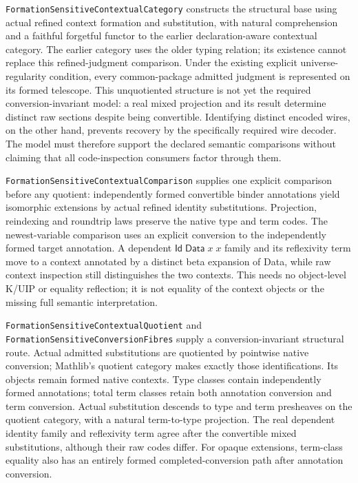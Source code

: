 \documentclass[11pt]{article}
\theoremstyle{definition}
\theoremstyle{remark}
\begin{document}
\nolinkurl{FormationSensitiveContextualCategory} constructs the structural
base using actual refined context formation and substitution, with natural
comprehension and a faithful forgetful functor to the earlier
declaration-aware contextual category. The earlier category uses the older
typing relation; its existence cannot replace this refined-judgment
comparison. Under the existing explicit universe-regularity condition, every
common-package admitted judgment is represented on its formed telescope.
This unquotiented structure is not yet the required conversion-invariant
model: a real mixed projection and its result determine distinct raw
sections despite being convertible. Identifying distinct encoded wires,
on the other hand, prevents recovery by the specifically required wire
decoder. The model must therefore support the declared semantic comparisons
without claiming that all code-inspection consumers factor through them.

\nolinkurl{FormationSensitiveContextualComparison} supplies one explicit
comparison before any quotient: independently formed convertible binder
annotations yield isomorphic extensions by actual refined identity
substitutions. Projection, reindexing and roundtrip laws preserve the native
type and term codes. The newest-variable comparison uses an explicit
conversion to the independently formed target annotation. A dependent
$\mathsf{Id}\;\mathsf{Data}\;x\;x$ family and its reflexivity term move to a
context annotated by a distinct beta expansion of Data, while raw context
inspection still distinguishes the two contexts. This needs no object-level
K/UIP or equality reflection; it is not equality of the context objects or
the missing full semantic interpretation.

\nolinkurl{FormationSensitiveContextualQuotient} and
\nolinkurl{FormationSensitiveConversionFibres} supply a conversion-invariant
structural route. Actual admitted substitutions are quotiented by pointwise
native conversion; Mathlib's quotient category makes exactly those
identifications. Its objects remain formed native contexts. Type classes
contain independently formed annotations; total term classes retain both
annotation conversion and term conversion. Actual substitution descends
to type and term presheaves on the quotient category, with a natural
term-to-type projection. The real dependent identity family and reflexivity
term agree after the convertible mixed substitutions, although their raw
codes differ. For opaque extensions, term-class equality also has an
entirely formed completed-conversion path after annotation conversion.
\end{document}
